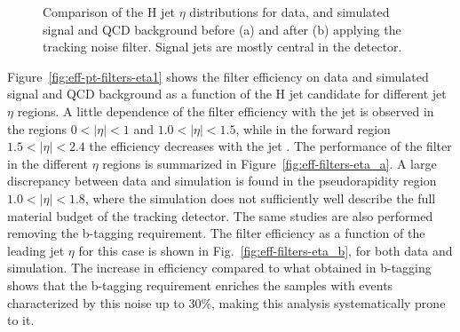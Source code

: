 \begin{figure}[!htb]
\centering
{}
\caption{Comparison of the H jet $\eta$ distributions for data, and simulated signal and QCD background before (a) and after (b) applying the
tracking noise filter. Signal jets are mostly central in the detector.}
\label{fig:hbbjeteta}
\end{figure}

Figure~\ref{fig:eff-pt-filters-eta1} shows the filter efficiency on data and simulated signal and QCD background as a function 
of the H jet candidate \pt for different jet $\eta$ regions.
A little dependence of the filter efficiency with the jet \pt is observed in the regions $0 < |\eta| < 1$ and $1.0 < |\eta| < 1.5$, 
while in the forward region $1.5 < |\eta| < 2.4$ the efficiency decreases with the jet \pt. 
The performance of the filter in the different $\eta$ regions is summarized in Figure~\ref{fig:eff-filters-eta_a}.
A large discrepancy between data and simulation is found in the pseudorapidity region $1.0 < |\eta| < 1.8$, 
where the simulation does not sufficiently well describe the full material budget of the tracking detector.
The same studies are also performed removing the b-tagging requirement. The filter efficiency as a function of the leading 
jet $\eta$ for this case is shown in Fig.~\ref{fig:eff-filters-eta_b}, for both data and simulation.
The increase in efficiency compared to what obtained in b-tagging shows that 
the b-tagging requirement enriches the samples with events characterized by this noise up to 30\%, making this analysis systematically prone to it.

